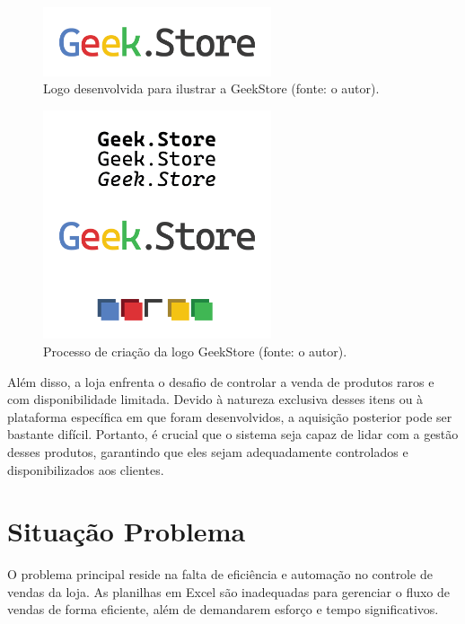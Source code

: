 \documentclass[
	12pt,				%
	openright,			%
	twoside,			%
	a4paper,			%
	english,			%
	brazil				%
	]{abntex2}
\begin{document}
\begin{figure}[htb]
	\centering
	\includegraphics[width=0.6\textwidth]{img/geekstore/Artboard 2.png}
	\caption{Logo desenvolvida para ilustrar a GeekStore (fonte: o autor).}
	\label{fig:logo-geekstore}
\end{figure}

\begin{figure}[htb]
	\centering
	\includegraphics[width=0.6\textwidth]{img/geekstore/Artboard 1.png}
	\caption{Processo de criação da logo GeekStore (fonte: o autor).}
	\label{fig:criacao-logo-geekstore}
\end{figure}

Além disso, a loja enfrenta o desafio de controlar a venda de produtos raros e com disponibilidade limitada. Devido à natureza exclusiva desses itens ou à plataforma específica em que foram desenvolvidos, a aquisição posterior pode ser bastante difícil. Portanto, é crucial que o sistema seja capaz de lidar com a gestão desses produtos, garantindo que eles sejam adequadamente controlados e disponibilizados aos clientes.


\section{Situação Problema}
O problema principal reside na falta de eficiência e automação no controle de vendas da loja. As planilhas em Excel são inadequadas para gerenciar o fluxo de vendas de forma eficiente, além de demandarem esforço e tempo significativos.
\end{document}
